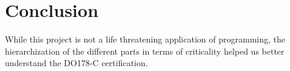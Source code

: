 \section{Conclusion}

While this project is not a life threatening application of programming, the hierarchization of the different parts in terms of criticality helped us better understand the DO178-C certification.


\newpage

